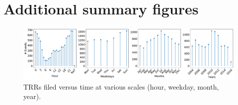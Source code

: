 \section{Additional summary figures}\label{sec:additional_figs}

\begin{figure}[t!] 
	\includegraphics[width=\textwidth]{figs/trrs_times} 
	\caption{TRRs filed versus time at various scales (hour, weekday, month, year).} \label{fig:trrs_times}
\end{figure}

